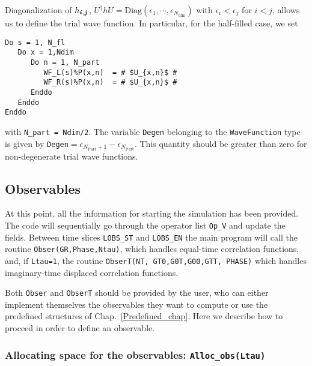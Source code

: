 Diagonalization  of  $ h_{\boldsymbol{i},\boldsymbol{j}}$,      $U^{\dagger} h  U  = \mathrm{Diag} \left(   \epsilon_1, \cdots, \epsilon_{N_{\mathrm{dim}}} \right) $     with  $\epsilon_i  <  \epsilon_j $  for $i < j$, allows us  to define the  trial wave function.  In particular, for the half-filled case, we set 
\begin{lstlisting}[style=fortran,escapechar=\#]
Do s = 1, N_fl
   Do x = 1,Ndim
      Do n = 1, N_part
         WF_L(s)%P(x,n)  = # $U_{x,n}$ #
         WF_R(s)%P(x,n)  = # $U_{x,n}$ #
      Enddo
   Enddo
Enddo
\end{lstlisting}
with \texttt{N\_part = Ndim/2}.     The  variable \texttt{Degen}   belonging to the \texttt{WaveFunction}  type  is given by  \texttt{Degen}$=\epsilon_{N_{\mathrm{Part}} +1 } - \epsilon_{N_{\mathrm{Part}}  }$.   This quantity should be greater than zero  for non-degenerate trial wave functions. 

\subsection{Observables}

At this point, all the information for starting the simulation has been provided.  The code will sequentially go through  the operator list  \texttt{Op\_V}  and update the  fields.  Between  time slices  \texttt{LOBS\_ST}  and  \texttt{LOBS\_EN} the main program will call the routine  \texttt{Obser(GR,Phase,Ntau)}, which handles equal-time correlation functions, and, if \texttt{Ltau=1}, the routine \texttt{ObserT(NT,  GT0,G0T,G00,GTT, PHASE)} which handles imaginary-time displaced correlation functions. 

Both \texttt{Obser} and \texttt{ObserT} should be provided by the user, who can either implement themselves the observables they want to compute or use the predefined structures of Chap.~\ref{Predefined_chap}. Here we describe how to proceed in order to define an observable. 

\subsubsection[Allocating space for the observables: \texttt{Alloc\_obs}]{Allocating space for the observables: \texttt{Alloc\_obs(Ltau)}} \label{Alloc_obs_sec}


